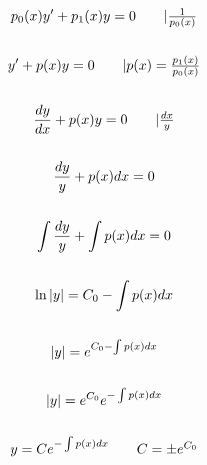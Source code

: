 \begin{gather*}
    p_0(x)y' + p_1(x)y = 0 \tag*{$| \frac{1}{p_0(x)}$} \\ \\
    y' + p(x)y = 0 \tag*{$| p(x) = \frac{p_1(x)}{p_0(x)}$} \\ \\
    \frac{dy}{dx} + p(x)y = 0 \tag*{$| \frac{dx}{y}$} \\ \\
    \frac{dy}{y} + p(x)dx = 0 \\ \\
    \int \frac{dy}{y} + \int p(x)dx = 0 \\ \\
    \ln |y| = C_0 - \int p(x)dx \\ \\
    |y| = e^{C_0 - \int p(x)dx} \\ \\
    |y| = e^{C_0}e^{-\int p(x)dx} \\ \\
    y = Ce^{-\int p(x)dx} \tag*{$C = \pm e^{C_0}$}
\end{gather*}